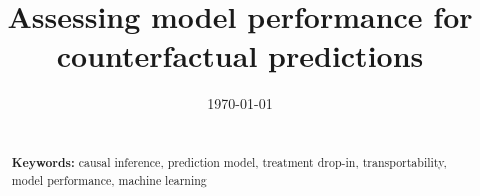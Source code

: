 \documentclass[12pt]{article}
\begin{document}
\begin{titlepage}
\title{Assessing model performance for counterfactual predictions} %
\author{}
\date{\today}
\maketitle

\begin{abstract}
\noindent 
\vspace{0in} \\
\noindent\textbf{Keywords:} causal inference, prediction model, treatment drop-in, transportability, model performance, machine learning \\

\bigskip
\end{abstract}
\setcounter{page}{0}
\thispagestyle{empty}
\end{titlepage}
\pagebreak \newpage

\doublespacing



\clearpage

\printbibliography

\clearpage

\begin{appendix}
    \renewcommand{\thefigure}{A\arabic{figure}}
    \setcounter{figure}{0}
    
    \renewcommand{\thetable}{A\arabic{table}}
    \setcounter{table}{0}
    
    \renewcommand{\theequation}{A\arabic{equation}}
    \setcounter{equation}{0}

    \renewcommand{\thesection}{\Alph{section}}

    \newpage

    
\end{appendix}

\onehalfspacing
\end{document}

